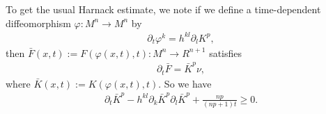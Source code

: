 \documentclass{amsart}
\theoremstyle{definition}
\theoremstyle{remark}
\numberwithin{equation}{section}
\begin{document}
To get the usual Harnack estimate, we note if we define a time-dependent diffeomorphism $\varphi: M^n\to M^n$ by
\begin{align}
\partial_t\varphi^k=h^{kl}\partial_l K^{ p },
\end{align}
then $\bar{F}(x,t):=F(\varphi(x,t),t):M^{n}\to R^{n+1}$ satisfies
\begin{align}
\partial_t\bar{F}=\bar{K}^{ p }\nu,
\end{align}
where $\bar{K}(x,t):=K(\varphi(x,t),t)$. So we have
\begin{align}
\partial_t\bar{K}^{ p }-h^{kl}\partial_k\bar{K}^{ p }\partial_l\bar{K}^{ p }+\frac{n p }{(n p +1)t}\geq 0.
\end{align}
\end{document}
